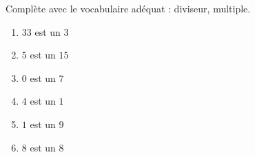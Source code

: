 %
%
	Complète avec le vocabulaire adéquat : diviseur, multiple.
	\begin{enumerate}[cols=3, itemsep=.5cm]
		\item \(33\) est un  \dotfill \(3\)
		\item \(5\) est un  \dotfill \(15\)
		\item \(0\) est un  \dotfill \(7\)
		\item \(4\) est un  \dotfill \(1\)
		\item \(1\) est un  \dotfill \(9\)
		\item \(8\) est un  \dotfill \(8\)
	\end{enumerate}
